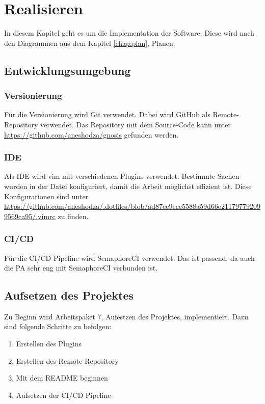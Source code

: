 \chapter{Realisieren}
In diesem Kapitel geht es um die Implementation der Software. Diese wird nach den Diagrammen aus dem Kapitel
\ref{chap:plan}, Planen.

\section{Entwicklungsumgebung}
\subsection{Versionierung}
Für die Versionierung wird Git verwendet. Dabei wird GitHub als Remote-Repository verwendet. Das Repository mit
dem Source-Code kann unter \url{https://github.com/aneshodza/gnosis} gefunden werden.

\subsection{IDE}
Als IDE wird vim mit verschiedenen Plugins verwendet. Bestimmte Sachen wurden in der  Datei
konfiguriert, damit die Arbeit möglichst effizient ist. \newline
Diese Konfigurationen sind unter \newline
\url{https://github.com/aneshodza/.dotfiles/blob/ad87ee9ecc5588a59d66e211797792099569ca95/.vimrc} zu finden.

\subsection{CI/CD}
Für die CI/CD Pipeline wird SemaphoreCI verwendet. Das ist passend, da auch die PA sehr eng mit SemaphoreCI verbunden
ist.

\begin{minipage}{\textwidth}
  \section{Aufsetzen des Projektes}
  Zu Beginn wird Arbeitspaket 7, Aufestzen des Projektes, implementiert. Dazu sind folgende Schritte zu befolgen:
  \begin{enumerate}
    \item Erstellen des Plugins
    \item Erstellen des Remote-Repository
    \item Mit dem README beginnen
    \item Aufsetzen der CI/CD Pipeline \newline
  \end{enumerate}
\end{minipage}

